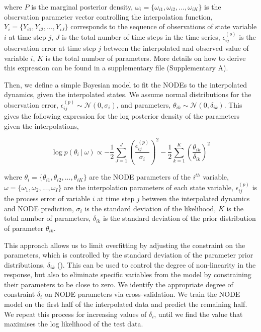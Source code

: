\documentclass[11pt, oneside]{article}
\begin{document}
where $P$ is the marginal posterior density,
$\omega_i = \{\omega_{i1},\omega_{i2},...,\omega_{iK}\}$ is the observation parameter vector controlling the interpolation function,
$Y_i = \{Y_{i1},Y_{i2},...,Y_{iJ}\}$ corresponds to the sequence of observations of state variable $i$ at time step $j$, 
$J$ is the total number of time steps in the time series, 
$\epsilon^{(o)}_{ij}$ is the observation error at time step $j$ between the interpolated and observed  value of variable $i$, 
$K$ is the total number of parameters. 
More details on how to derive this expression can be found in a supplementary file (Supplementary A).

Then, we define a simple Bayesian model to fit the NODEs to the interpolated dynamics, given the interpolated states.
We assume normal distributions for the observation error, $\epsilon^{(p)}_{ij} \sim \mathcal{N}(0,\sigma_i)$, and parameters, $\theta_{ik} \sim \mathcal{N}(0,\delta_{ik})$.
This gives the following expression for the log posterior density of the parameters given the interpolations,

\vspace{-0.5cm}
\begin{equation}
    \log p(\theta_i ~|~ \omega) \propto - \frac{1}{2} \sum_{J=1}^{J} \left( \frac{\epsilon^{(p)}_{ij}}{\sigma_i} \right)^2 - \frac{1}{2} \sum_{k=1}^{K} \left( \frac{\theta_{ik}}{\delta_{ik}} \right)^2
\end{equation}

where $\theta_i = \{\theta_{i1},\theta_{i2},...,\theta_{iK}\}$ are the NODE parameters of the $i^{th}$ variable,
$\omega = \{\omega_1,\omega_2,...,\omega_I\}$ are the interpolation parameters of each state variable, 
$\epsilon^{(p)}_{ij}$ is the process error of variable $i$ at time step $j$ between the interpolated dynamics and NODE prediction, 
$\sigma_i$ is the standard deviation of the likelihood, 
$K$ is the total number of parameters, 
$\delta_{ik}$ is the standard deviation of the prior distribution of parameter $\theta_{ik}$.

This approach allows us to limit overfitting by adjusting the constraint on the parameters, which is controlled by the standard deviation of the parameter prior distributions, $\delta_{ik}$ (\cite{Cawley2007, Bonnaffe2021a}).
This can be used to control the degree of non-linearity in the response, but also to eliminate specific variables from the model by constraining their parameters to be close to zero.
We identify the appropriate degree of constraint $\delta_{i}$ on NODE parameters via cross-validation. 
We train the NODE model on the first half of the interpolated data and predict the remaining half.
We repeat this process for increasing values of $\delta_{i}$, until we find the value that maximises the log likelihood of the test data.
\end{document}
